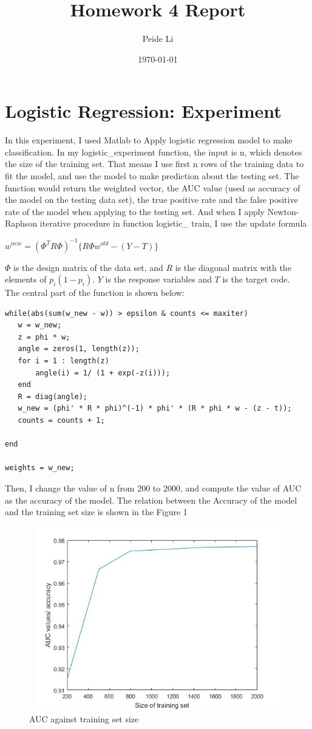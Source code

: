 \documentclass[letterpaper,12pt]{article}
\title{Homework 4 Report}
\author{Peide Li}
\date{\today}
\begin{document}
\maketitle
\section{Logistic Regression: Experiment}
In this experiment, I used Matlab to Apply logistic regression model to make classification. In my logistic\_experiment function, the input is n, which denotes the size of the training set. That means I use first n rows of the training data to fit the model, and use the model to make prediction about the testing set. The function would return the weighted vector, the AUC value (used as accuracy of the model on the testing data set), the true positive rate and the false positive rate of the model when applying to the testing set. And when I apply Newton-Raphson iterative procedure in function logistic\_ train, I use the update formula 
\begin{center}

$w^{new} = (\Phi^{T}R\Phi)^{-1} \{ R \Phi w^{old} - (Y - T) \}$

\end{center}
$\Phi$ is the design matrix of the data set, and $R$ is the diagonal matrix with the elements of $p_{i}(1 - p_{i})$. $Y$ is the response variables and $T$ is the target code.\\
The central part of the function is shown below:
\begin{lstlisting}  
while(abs(sum(w_new - w)) > epsilon & counts <= maxiter)
   w = w_new;
   z = phi * w;
   angle = zeros(1, length(z));
   for i = 1 : length(z)
       angle(i) = 1/ (1 + exp(-z(i)));
   end
   R = diag(angle);
   w_new = (phi' * R * phi)^(-1) * phi' * (R * phi * w - (z - t));
   counts = counts + 1;
    
end

weights = w_new;
\end{lstlisting}  
Then, I change the value of n from 200 to 2000, and compute the value of AUC as the accuracy of the model. The relation between the Accuracy of the model and the training set size is shown in the Figure 1
\begin{center}
\begin{figure}
\includegraphics[width = 16cm, height = 8cm]{"Figure1.jpg"}
\caption{AUC against training set size}
\end{figure}
\end{center}
\end{document}
